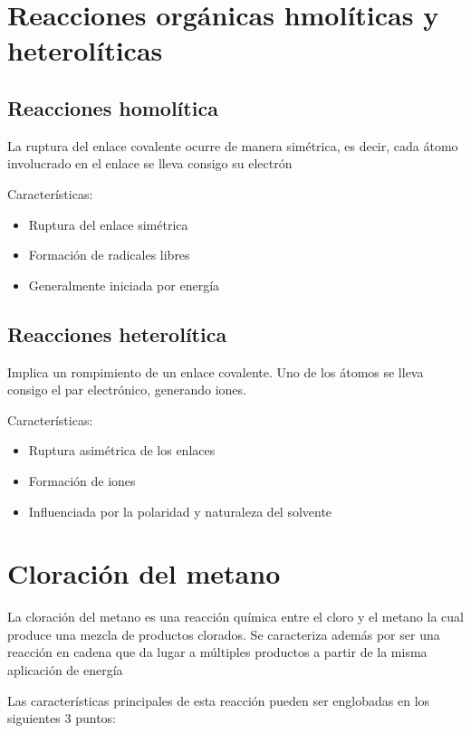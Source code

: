 \section{Reacciones orgánicas hmolíticas y heterolíticas}

\subsection{Reacciones homolítica}

La ruptura del enlace covalente ocurre de manera simétrica, es decir, cada átomo involucrado en el enlace se lleva consigo su electrón

Características:

\begin{itemize}
    \item Ruptura del enlace simétrica
    \item Formación de radicales libres
    \item Generalmente iniciada por energía
\end{itemize}

\subsection{Reacciones heterolítica}

Implica un rompimiento de un enlace covalente. Uno de los átomos se lleva consigo el par electrónico, generando iones.

Características:
\begin{itemize}
    \item Ruptura asimétrica de los enlaces
    \item Formación de iones
    \item Influenciada por la polaridad y naturaleza del solvente
\end{itemize}

\section{Cloración del metano}

La cloración del metano es una reacción química entre el cloro y el metano la cual produce una mezcla de productos clorados. Se caracteriza además por ser una reacción en cadena que da lugar a múltiples productos a partir de la misma aplicación de energía

Las características principales de esta reacción pueden ser englobadas en los siguientes 3 puntos:

